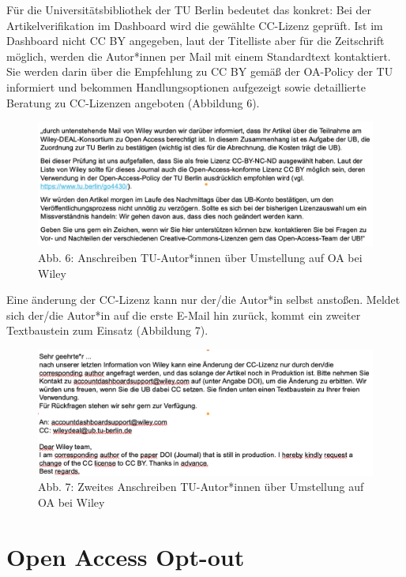 \documentclass[a4paper,
fontsize=11pt,
oneside,
numbers=noperiodatend,
parskip=half-,
bibliography=totoc,
final
]{scrartcl}
\begin{document}
Für die Universitätsbibliothek der TU Berlin bedeutet das konkret: Bei
der Artikelverifikation im Dashboard wird die gewählte CC-Lizenz
geprüft. Ist im Dashboard nicht CC BY angegeben, laut der Titelliste
aber für die Zeitschrift möglich, werden die Autor*innen per Mail mit
einem Standardtext kontaktiert. Sie werden darin über die Empfehlung zu
CC BY gemäß der OA-Policy der TU informiert und bekommen
Handlungsoptionen aufgezeigt sowie detaillierte Beratung zu CC-Lizenzen
angeboten (Abbildung 6).

\begin{figure}
\centering
\includegraphics{img/WileyretroOAauthor.png}
\caption{Abb. 6: Anschreiben TU-Autor*innen über Umstellung auf OA bei
Wiley}
\end{figure}

Eine änderung der CC-Lizenz kann nur der/die Autor*in selbst anstoßen.
Meldet sich der/die Autor*in auf die erste E-Mail hin zurück, kommt ein
zweiter Textbaustein zum Einsatz (Abbildung 7).

\begin{figure}
\centering
\includegraphics{img/WileyretroOAauthor2.png}
\caption{Abb. 7: Zweites Anschreiben TU-Autor*innen über Umstellung auf OA bei
Wiley}
\end{figure}

\hypertarget{open-access-opt-out}{%
\section{Open Access Opt-out}\label{open-access-opt-out}}
\end{document}
